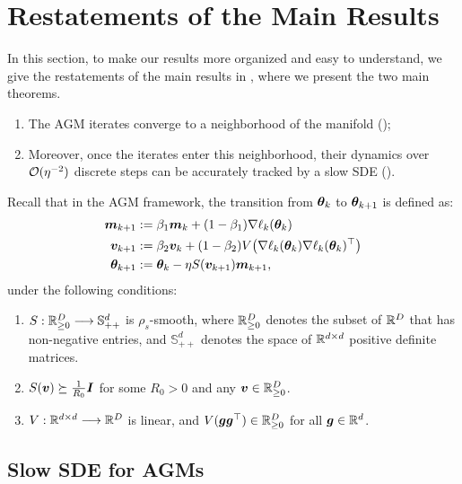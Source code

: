 \section{Restatements of the Main Results}\label{sec:formal-statement}
In this section, to make our results more organized and easy to understand, we give the restatements of the main results in , where we present the two main theorems.
\begin{enumerate}
  \item The AGM iterates converge to a neighborhood of the manifold ();
  \item Moreover, once the iterates enter this neighborhood, their dynamics over $\mathcal{O}(\eta^{-2})$ discrete steps can be accurately tracked by a slow SDE ().
\end{enumerate}


Recall that in the AGM framework, the transition from ${\bm{\theta}}_{k}$ to ${\bm{\theta}}_{k+1}$ is defined as:
\begin{align*}
    {\bm{m}}_{k+1} &:= \beta_1 {\bm{m}}_{k} + (1-\beta_1) \nabla \ell_{k}({\bm{\theta}}_{k}) \\
    {\bm{v}}_{k+1} &:= \beta_2 {\bm{v}}_{k} + (1-\beta_2) V\!\left(\nabla\ell_{k}({\bm{\theta}}_{k}) \nabla\ell_{k}({\bm{\theta}}_{k})^\top\right) \\
    {\bm{\theta}}_{k+1} &:= {\bm{\theta}}_{k} - \eta S({\bm{v}}_{k+1}) {\bm{m}}_{k+1},
\end{align*}
under the following conditions:
\begin{enumerate}
    \item $S: \mathbb{R}_{\ge 0}^{D} \longrightarrow \mathbb{S}^d_{++}$ is $\rho_s$-smooth, where $\mathbb{R}_{\ge 0}^{D}$ denotes the subset of $\mathbb{R}^D$ that has non-negative entries, and $\mathbb{S}^d_{++}$ denotes the space of $\mathbb{R}^{d \times d}$ positive definite matrices. 
    \item $S({\bm{v}}) \succeq \frac{1}{R_0} {\bm{I}}$  for some $R_0 > 0$ and any ${\bm{v}} \in \mathbb{R}_{\ge 0}^{D}$.
    \item $V: \mathbb{R}^{d\times d} \longrightarrow \mathbb{R}^{D}$ is linear, and $V({\bm{g}}{\bm{g}}^\top) \in \mathbb{R}_{\ge 0}^{D}$ for all ${\bm{g}} \in \mathbb{R}^d$.
\end{enumerate}



\subsection{Slow SDE for AGMs}

